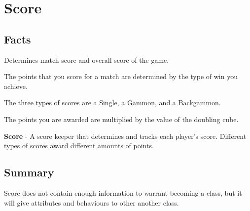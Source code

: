 \section{Score}

\subsection{Facts}

\begin{dashed}
    \item Determines match score and overall score of the game.
    \item The points that you score for a match are determined by the type of win you achieve.
    \item The three types of scores are a Single, a Gammon, and a Backgammon.
    \item The points you are awarded are multiplied by the value of the doubling cube.
\end{dashed}

\noindent
\newline\textbf{Score} - A score keeper that determines and tracks
each player's score. Different types of scores award different
amounts of points.

\subsection{Summary}
Score does not contain enough information to warrant becoming a class, but it will give attributes and behaviours to other another class.
